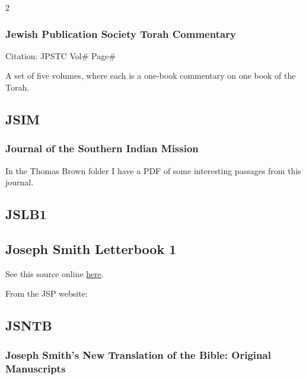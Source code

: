 \begin{multicols}{2}
		\subsubsection*{Jewish Publication Society Torah Commentary}
		
			Citation:
				JPSTC Vol\# Page\#
				
			A set of five volumes, where each is a one-book commentary on one book of the Torah.
			
	\subsection*{JSIM}
	
		\subsubsection*{Journal of the Southern Indian Mission}
		
			In the Thomas Brown folder I have a PDF of some interesting passages from this journal.
			
	\subsection*{JSLB1}
		\label{JSLB1}
	
		\subsection*{Joseph Smith Letterbook 1}
		
			See this source online \href{https://www.josephsmithpapers.org/paper-summary/letterbook-1/1}{here}.
			
			From the JSP website:
			
	\subsection*{JSNTB}
	
		\subsubsection*{Joseph Smith's New Translation of the Bible: Original Manuscripts}
		

\end{multicols}

